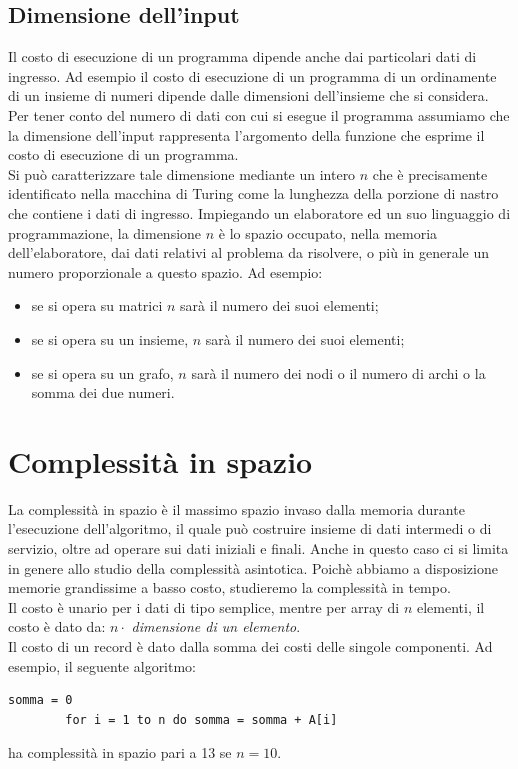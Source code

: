 \documentclass[12pt]{report}
\begin{document}
   	\subsection{Dimensione dell'input}
   	Il costo di esecuzione di un programma dipende anche dai particolari dati di ingresso. Ad esempio il costo di esecuzione di un programma di un ordinamente di un insieme di numeri dipende dalle dimensioni dell'insieme che si considera. Per tener conto del numero di dati con cui si esegue il programma assumiamo che la dimensione dell'input rappresenta l'argomento della funzione che esprime il costo di esecuzione di un programma. \\
   	Si può caratterizzare tale dimensione mediante un intero $n$ che è precisamente identificato nella macchina di Turing come la lunghezza della porzione di nastro che contiene i dati di ingresso. Impiegando un elaboratore ed un suo linguaggio di programmazione, la dimensione $n$ è lo spazio occupato, nella memoria dell'elaboratore, dai dati relativi al problema da risolvere, o più in generale un numero proporzionale a questo spazio. Ad esempio:
   	\begin{itemize}
   		\item se si opera su matrici $n$ sarà il numero dei suoi elementi;
   		\item se si opera su un insieme, $n$ sarà il numero dei suoi elementi;
   		\item se si opera su un grafo, $n$ sarà il numero dei nodi o il numero di archi o la somma dei due numeri.
   	\end{itemize}
   	\section{Complessità in spazio}
   	La complessità in spazio è il massimo spazio invaso dalla memoria durante l'esecuzione dell'algoritmo, il quale può costruire insieme di dati intermedi o di servizio, oltre ad operare sui dati iniziali e finali. Anche in questo caso ci si limita in genere allo studio della complessità asintotica. Poichè abbiamo a disposizione memorie grandissime a basso costo, studieremo la complessità in tempo. \\
   	Il costo è unario per i dati di tipo semplice, mentre per array di $n$ elementi, il costo è dato da: $n \cdot$ \textit{dimensione di un elemento}. \\
   	Il costo di un record è dato dalla somma dei costi delle singole componenti. Ad esempio, il seguente algoritmo:
   	\begin{lstlisting}[style=pascalstyle]
   		somma = 0
   		for i = 1 to n do somma = somma + A[i]
   	\end{lstlisting}
   	ha complessità in spazio pari a 13 se $n = 10$.
\end{document}
